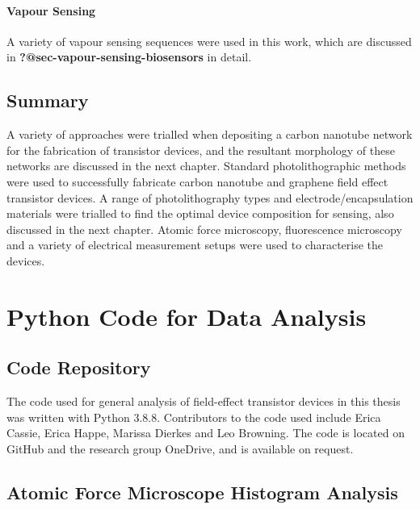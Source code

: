 \documentclass[
  a4paper,
]{scrbook}
\begin{document}
\hypertarget{vapour-sensing}{%
\subsubsection*{Vapour Sensing}\label{vapour-sensing}}

A variety of vapour sensing sequences were used in this work, which are
discussed in \textbf{?@sec-vapour-sensing-biosensors} in detail.

\hypertarget{summary}{%
\section{Summary}\label{summary}}

A variety of approaches were trialled when depositing a carbon nanotube
network for the fabrication of transistor devices, and the resultant
morphology of these networks are discussed in the next chapter. Standard
photolithographic methods were used to successfully fabricate carbon
nanotube and graphene field effect transistor devices. A range of
photolithography types and electrode/encapsulation materials were
trialled to find the optimal device composition for sensing, also
discussed in the next chapter. Atomic force microscopy, fluorescence
microscopy and a variety of electrical measurement setups were used to
characterise the devices.

\appendix
{}

\hypertarget{sec-python}{%
\chapter{Python Code for Data Analysis}\label{sec-python}}

\hypertarget{code-repository}{%
\section{Code Repository}\label{code-repository}}

The code used for general analysis of field-effect transistor devices in
this thesis was written with Python 3.8.8. Contributors to the code used
include Erica Cassie, Erica Happe, Marissa Dierkes and Leo Browning. The
code is located on GitHub and the research group OneDrive, and is
available on request.

\hypertarget{sec-histogram-analysis}{%
\section{Atomic Force Microscope Histogram
Analysis}\label{sec-histogram-analysis}}
\end{document}
